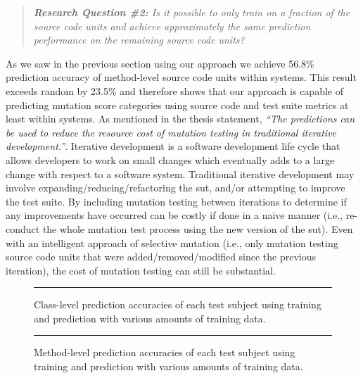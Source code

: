 \begin{quote}
  \emph{\textbf{Research Question \#2:} Is it possible to only train on a fraction of the source code units and achieve approximately the same prediction performance on the remaining source code units?}
\end{quote}

\noindent
As we saw in the previous section using our approach we achieve 56.8\% prediction accuracy of method-level source code units within systems. This result exceeds random by 23.5\% and therefore shows that our approach is capable of predicting mutation score categories using source code and test suite metrics at least within systems. As mentioned in the thesis statement, \emph{``The predictions can be used to reduce the resource cost of mutation testing in traditional iterative development.''}. Iterative development is a software development life cycle that allows developers to work on small changes which eventually adds to a large change with respect to a software system. Traditional iterative development may involve expanding/reducing/refactoring the \gls{sut}, and/or attempting to improve the test suite. By including mutation testing between iterations to determine if any improvements have occurred can be costly if done in a naive manner (i.e., re-conduct the whole mutation test process using the new version of the \gls{sut}). Even with an intelligent approach of selective mutation (i.e., only mutation testing source code units that were added/removed/modified since the previous iteration), the cost of mutation testing can still be substantial.

\begin{figure}[!tb]
  \centering
  \begin{adjustbox}{max size={.95\textwidth}{.90\textheight}}
    
  \end{adjustbox}
  \caption{Class-level prediction accuracies of each test subject using training and prediction with various amounts of training data.}
  \vspace{2mm}
  \hrule
  \label{fig:divisor_class_graph}
\end{figure}

\begin{figure}[!tb]
  \centering
  \begin{adjustbox}{max size={.95\textwidth}{.90\textheight}}
    
  \end{adjustbox}
  \caption{Method-level prediction accuracies of each test subject using training and prediction with various amounts of training data.}
  \vspace{2mm}
  \hrule
  \label{fig:divisor_method_graph}
\end{figure}

